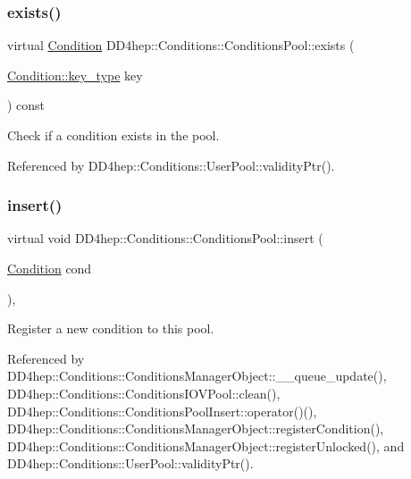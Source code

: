 \subsubsection{\texorpdfstring{exists()}{exists()}}
{\footnotesize\ttfamily virtual \hyperlink{class_d_d4hep_1_1_conditions_1_1_condition}{Condition} D\+D4hep\+::\+Conditions\+::\+Conditions\+Pool\+::exists (\begin{DoxyParamCaption}\item[{\hyperlink{class_d_d4hep_1_1_conditions_1_1_condition_a7528efa762e8cc072ef80ea67c3531f9}{Condition\+::key\+\_\+type}}]{key }\end{DoxyParamCaption}) const\hspace{0.3cm}{\ttfamily [pure virtual]}}



Check if a condition exists in the pool. 



Referenced by D\+D4hep\+::\+Conditions\+::\+User\+Pool\+::validity\+Ptr().

\hypertarget{class_d_d4hep_1_1_conditions_1_1_conditions_pool_a90abd47fd41d04d96b180aa244786b01}{}\label{class_d_d4hep_1_1_conditions_1_1_conditions_pool_a90abd47fd41d04d96b180aa244786b01} 
\subsubsection{\texorpdfstring{insert()}{insert()}\hspace{0.1cm}{\footnotesize\ttfamily [1/2]}}
{\footnotesize\ttfamily virtual void D\+D4hep\+::\+Conditions\+::\+Conditions\+Pool\+::insert (\begin{DoxyParamCaption}\item[{\hyperlink{class_d_d4hep_1_1_conditions_1_1_condition}{Condition}}]{cond }\end{DoxyParamCaption})\hspace{0.3cm}{\ttfamily [protected]}, {}}



Register a new condition to this pool. 



Referenced by D\+D4hep\+::\+Conditions\+::\+Conditions\+Manager\+Object\+::\+\_\+\+\_\+queue\+\_\+update(), D\+D4hep\+::\+Conditions\+::\+Conditions\+I\+O\+V\+Pool\+::clean(), D\+D4hep\+::\+Conditions\+::\+Conditions\+Pool\+Insert\+::operator()(), D\+D4hep\+::\+Conditions\+::\+Conditions\+Manager\+Object\+::register\+Condition(), D\+D4hep\+::\+Conditions\+::\+Conditions\+Manager\+Object\+::register\+Unlocked(), and D\+D4hep\+::\+Conditions\+::\+User\+Pool\+::validity\+Ptr().

